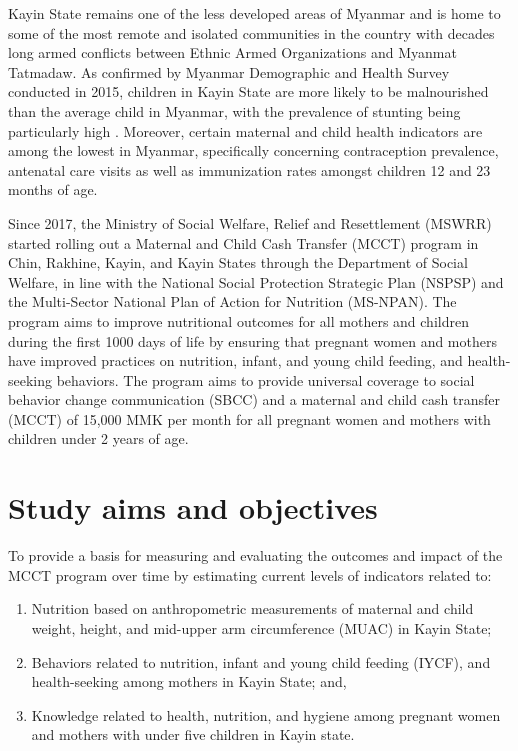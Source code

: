 \documentclass[12pt,a4paper]{article}
\begin{document}
Kayin State remains one of the less developed areas of Myanmar and is home to some of the most remote and isolated communities in the country with decades long armed conflicts between Ethnic Armed Organizations and Myanmat Tatmadaw. As confirmed by Myanmar Demographic and Health Survey conducted in 2015, children in Kayin State are more likely to be malnourished than the average child in Myanmar, with the prevalence of stunting being particularly high \citep{MinistryofHealthandSports-MoHS/Myanmar2017}. Moreover, certain maternal and child health indicators are among the lowest in Myanmar, specifically concerning contraception prevalence, antenatal care visits as well as immunization rates amongst children 12 and 23 months of age.

Since 2017, the Ministry of Social Welfare, Relief and Resettlement (MSWRR) started rolling out a Maternal and Child Cash Transfer (MCCT) program in Chin, Rakhine, Kayin, and Kayin States through the Department of Social Welfare, in line with the National Social Protection Strategic Plan (NSPSP) and the Multi-Sector National Plan of Action for Nutrition (MS-NPAN). The program aims to improve nutritional outcomes for all mothers and children during the first 1000 days of life by ensuring that pregnant women and mothers have improved practices on nutrition, infant, and young child feeding, and health-seeking behaviors. The program aims to provide universal coverage to social behavior change communication (SBCC) and a maternal and child cash transfer (MCCT) of 15,000 MMK per month for all pregnant women and mothers with children under 2 years of age.

\hypertarget{objectives}{%
\section{Study aims and objectives}\label{objectives}}

To provide a basis for measuring and evaluating the outcomes and impact of the MCCT program over time by estimating current levels of indicators related to:

\begin{enumerate}
\def\labelenumi{\arabic{enumi}.}
\item
  Nutrition based on anthropometric measurements of maternal and child weight, height, and mid-upper arm circumference (MUAC) in Kayin State;
\item
  Behaviors related to nutrition, infant and young child feeding (IYCF), and health-seeking among mothers in Kayin State; and,
\item
  Knowledge related to health, nutrition, and hygiene among pregnant women and mothers with under five children in Kayin state.
\end{enumerate}
\end{document}
